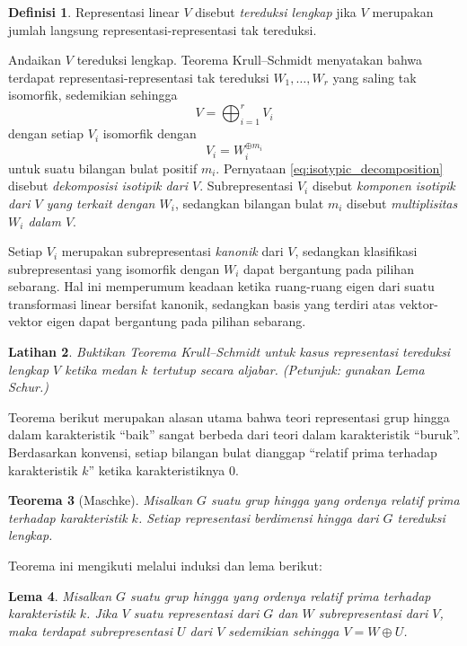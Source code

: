 \documentclass[12pt]{article}
\theoremstyle{plain}
\newtheorem{theorem}{Teorema}[section]
\newtheorem{lemma}[theorem]{Lema}
\newtheorem{exercise}[theorem]{Latihan}
\theoremstyle{definition}
\newtheorem{definition}[theorem]{Definisi}
\theoremstyle{remark}
\numberwithin{equation}{section}
\begin{document}
\begin{definition}
Representasi linear $V$ disebut \emph{tereduksi lengkap}
jika $V$ merupakan jumlah langsung representasi-representasi tak tereduksi.
\end{definition}

Andaikan $V$ tereduksi lengkap.
Teorema Krull--Schmidt menyatakan bahwa terdapat
representasi-representasi tak tereduksi $W_1, \ldots, W_r$ yang saling tak isomorfik,
sedemikian sehingga
\begin{equation} \label{eq:isotypic_decomposition}
V = \bigoplus_{i=1}^r V_i
\end{equation}
dengan setiap $V_i$ isomorfik dengan
\[
V_i = W_i^{\oplus m_i}
\]
untuk suatu bilangan bulat positif $m_i$.
Pernyataan \eqref{eq:isotypic_decomposition} disebut
\emph{dekomposisi isotipik dari $V$}.
Subrepresentasi $V_i$ disebut \emph{komponen isotipik dari
$V$ yang terkait dengan $W_i$}, sedangkan bilangan bulat $m_i$ disebut
\emph{multiplisitas $W_i$ dalam $V$}.

Setiap $V_i$ merupakan subrepresentasi \emph{kanonik} dari $V$,
sedangkan klasifikasi subrepresentasi yang isomorfik dengan $W_i$ dapat bergantung pada
pilihan sebarang.
Hal ini memperumum keadaan ketika ruang-ruang eigen dari suatu transformasi linear
bersifat kanonik, sedangkan basis yang terdiri atas vektor-vektor eigen
dapat bergantung pada pilihan sebarang.

\begin{exercise}
Buktikan Teorema Krull--Schmidt untuk kasus representasi
tereduksi lengkap $V$ ketika medan $k$ tertutup secara aljabar.
(Petunjuk: gunakan Lema Schur.)
\end{exercise}

Teorema berikut merupakan alasan utama bahwa teori representasi grup hingga
dalam karakteristik “baik” sangat berbeda dari teori dalam
karakteristik “buruk”.
Berdasarkan konvensi, setiap bilangan bulat dianggap “relatif prima terhadap karakteristik $k$”
ketika karakteristiknya $0$.

\begin{theorem}[Maschke]
Misalkan $G$ suatu grup hingga yang ordenya relatif prima terhadap karakteristik $k$.
Setiap representasi berdimensi hingga dari $G$ tereduksi lengkap.
\end{theorem}

Teorema ini mengikuti melalui induksi dan lema berikut:

\begin{lemma}
Misalkan $G$ suatu grup hingga yang ordenya relatif prima terhadap karakteristik $k$.
Jika $V$ suatu representasi dari $G$ dan $W$ subrepresentasi dari $V$,
maka terdapat subrepresentasi $U$ dari $V$
sedemikian sehingga $V= W \oplus U$.
\end{lemma}
\end{document}
